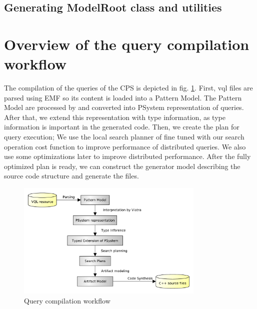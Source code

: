 \subsection{ Generating ModelRoot class and utilities }







\section{Overview of the query compilation workflow}

The compilation of the queries of the CPS is depicted in fig. \ref{figure:query-compile-workflow}. 
First, vql files are parsed using EMF so its content is loaded into a Pattern Model.
The Pattern Model are processed by \viatra{} and converted into PSystem representation of queries.
After that, we extend this representation with type information, as type information is important in the \cpp{} generated code.
Then, we create the plan for query execution; We use the local search planner of \viatra{} fine tuned with our search operation cost function to improve performance of distributed queries. 
We also use some optimizations later to improve distributed performance. 
After the fully optimized plan is ready, we can construct the generator model describing the source code structure and generate the \cpp{} files.


\begin{figure}[h]
	\begin{center}
		\includegraphics[width=0.8\textwidth]{figures/query-compilation-workflow.pdf}
		\caption{Query compilation workflow}
		\label{figure:query-compile-workflow}
	\end{center}
\end{figure}



